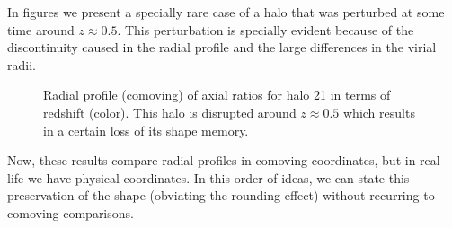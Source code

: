 In figures \label{fig:RedshiftDMbad} we present a specially rare case of a halo that was perturbed at some time around $z\approx 0.5$. This perturbation is specially evident because of the discontinuity caused in the radial profile and the large differences in the virial radii. \\  


\begin{figure}[!ht]
  \centering
  \hfill
  \caption{Radial profile (comoving) of axial ratios for halo 21 in terms of redshift (color). This halo is disrupted around $z \approx 0.5$ which results in a certain loss of its shape memory.}
  \label{fig:RedshiftBad}
\end{figure}

Now, these results compare radial profiles in comoving coordinates, but in real life we have physical coordinates. In this order of ideas, we can state this preservation of the shape (obviating the rounding effect) without recurring to comoving comparisons.\\

